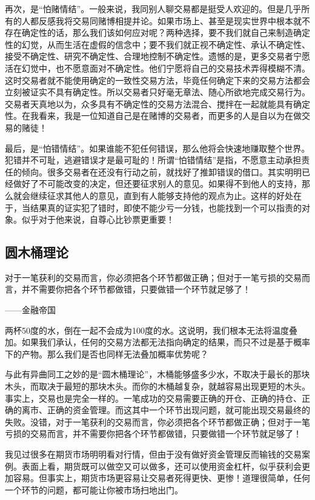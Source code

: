 再次，是“怕赌情结”。一般来说，我同别人聊交易都是挺受人欢迎的。但是几乎所有的人都反感我将交易同赌博相提并论。如果市场上、甚至是现实世界中根本就不存在确定性的话，那么我们该如何应对呢？两种选择，要不我们就自己来制造确定性的幻觉，从而生活在虚假的信念中；要不我们就正视不确定性、承认不确定性、接受不确定性、研究不确定性、合理地控制不确定性。遗憾的是，更多交易者宁愿活在幻觉中，也不愿意面对不确定性。他们宁愿将自己的交易技术弄得模糊不清。这时交易者就不能使用确定的一致性交易方法，毕竟任何确定下来的交易方法都会立刻被证实不具有确定性。所以交易者只好毫无章法、随心所欲地完成交易行为。交易者天真地以为，众多具有不确定性的交易方法混合、搅拌在一起就能具有确定性。在我看来，我是一位知道自己是在赌博的交易者，而更多的人是自以为在做交易的赌徒！

最后，是“怕错情结”。如果谁能不犯任何错误，那么他将会快速地赚取整个世界。犯错并不可耻，逃避错误才是最可耻的！所谓“怕错情结”是指，不愿意主动承担责任的倾向。很多交易者在还没有行动之前，就找好了推卸错误的借口。其实明明已经做好了不可能改变的决定，但还要征求别人的意见。如果得不到他人的支持，那么就会继续征求其他人的意见，直到有人能够支持他的观点为止。这样的好处在于，当结果真的证实犯了错时，即使不能少亏一分钱，也能找到一个可以指责的对象。似乎对于他来说，自尊心比钞票更重要！

\subsection{圆木桶理论}

{\kaishu
对于一笔获利的交易而言，你必须把各个环节都做正确；但对于一笔亏损的交易而言，并不需要你把各个环节都做错，只要做错一个环节就足够了！

\hfill ——金融帝国
}

两杯50度的水，倒在一起不会成为100度的水。这说明，我们根本无法将温度叠加。如果我们承认，任何的交易方法都无法指向确定的结果，而只不过是基于概率下的产物。那么我们是否也同样无法叠加概率优势呢？

与此有异曲同工之妙的是“圆木桶理论”，木桶能够盛多少水，不取决于最长的那块木头，而取决于最短的那块木头。而你的木桶越复杂，就越容易出现更短的木头。事实上，交易也是完全一样的。一笔成功的交易需要正确的开仓、正确的持仓、正确的离市、正确的资金管理。而这其中一个环节出现问题，就可能出现交易最终的失败。没错，对于一笔获利的交易而言，你必须把各个环节都做正确；但对于一笔亏损的交易而言，并不需要你把各个环节都做错，只要做错一个环节就足够了！

我见过很多在期货市场明明看对行情，但由于没有做好资金管理反而输钱的交易案例。表面上看，期货既可以做空又可以做多，还可以使用资金杠杆，似乎获利会更加容易。但事实上，期货市场更容易让交易者死得更快、更惨！道理很简单，任何一个环节的问题，都可能让你被市场扫地出门。


